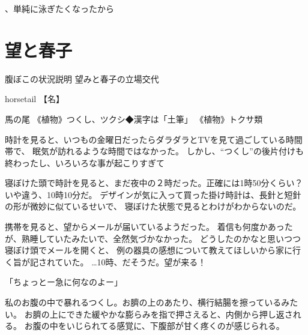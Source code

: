、単純に泳ぎたくなったから







\section{望と春子}
腹ぼこの状況説明
望みと春子の立場交代

 horsetail
【名】

    馬の尾
    《植物》つくし、ツクシ◆漢字は「土筆」
    《植物》トクサ類




時計を見ると、いつもの金曜日だったらダラダラとTVを見て過ごしている時間帯で、
眠気が訪れるような時間ではなかった。
しかし、“つくし”の後片付けも終わったし、いろいろな事が起こりすぎて


寝ぼけた頭で時計を見ると、まだ夜中の２時だった。正確には1時50分くらい？いや違う、10時10分だ。
デザインが気に入って買った掛け時計は、長針と短針の形が微妙に似ているせいで、
寝ぼけた状態で見るとわけがわからないのだ。

携帯を見ると、望からメールが届いているようだった。
着信も何度かあったが、熟睡していたみたいで、全然気づかなかった。
どうしたのかなと思いつつ寝ぼけ頭でメールを開くと、
例の器具の感想について教えてほしいから家に行く旨が記されていた。
…10時、だそうだ。望が来る！

「ちょっとー急に何なのよー」



私のお腹の中で暴れるつくし。お臍の上のあたり、横行結腸を擦っているみたい。
お臍の上にできた緩やかな膨らみを指で押さえると、内側から押し返される。
お腹の中をいじられてる感覚に、下腹部が甘く疼くのが感じられる。

